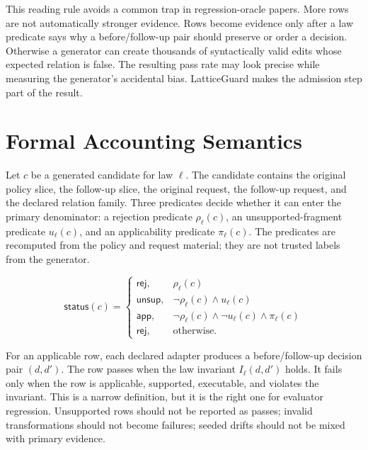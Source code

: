 \documentclass[10pt,conference]{IEEEtran}
\newcommand{\App}{\mathsf{app}}
\newcommand{\Rej}{\mathsf{rej}}
\newcommand{\Unsup}{\mathsf{unsup}}
\begin{document}
This reading rule avoids a common trap in regression-oracle papers.  More rows are not automatically stronger evidence.  Rows become evidence only after a law predicate says why a before/follow-up pair should preserve or order a decision.  Otherwise a generator can create thousands of syntactically valid edits whose expected relation is false.  The resulting pass rate may look precise while measuring the generator's accidental bias.  LatticeGuard makes the admission step part of the result.

\section{Formal Accounting Semantics}
Let $c$ be a generated candidate for law $\ell$.  The candidate contains the original policy slice, the follow-up slice, the original request, the follow-up request, and the declared relation family.  Three predicates decide whether it can enter the primary denominator: a rejection predicate $\rho_\ell(c)$, an unsupported-fragment predicate $u_\ell(c)$, and an applicability predicate $\pi_\ell(c)$.  The predicates are recomputed from the policy and request material; they are not trusted labels from the generator.

\begin{equation}
\mathsf{status}(c)=
\begin{cases}
\Rej, & \rho_\ell(c)\\
\Unsup, & \neg\rho_\ell(c)\wedge u_\ell(c)\\
\App, & \neg\rho_\ell(c)\wedge\neg u_\ell(c)\wedge\pi_\ell(c)\\
\Rej, & \text{otherwise.}
\end{cases}
\end{equation}

For an applicable row, each declared adapter produces a before/follow-up decision pair $(d,d')$.  The row passes when the law invariant $I_\ell(d,d')$ holds.  It fails only when the row is applicable, supported, executable, and violates the invariant.  This is a narrow definition, but it is the right one for evaluator regression.  Unsupported rows should not be reported as passes; invalid transformations should not become failures; seeded drifts should not be mixed with primary evidence.
\end{document}
